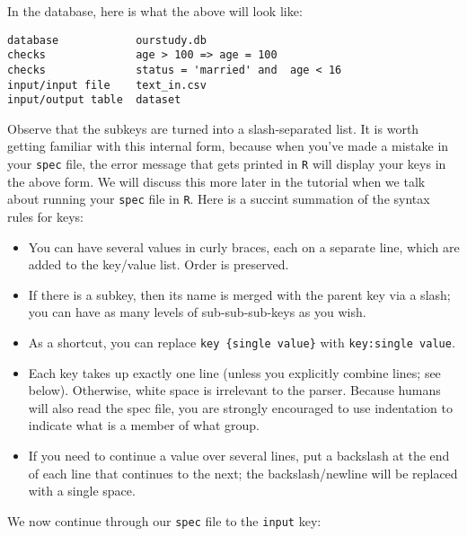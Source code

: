 \documentclass{article}
\begin{document}
In the database, here is what the above will look like:
\begin{verbatim}
database            ourstudy.db
checks              age > 100 => age = 100
checks              status = 'married' and  age < 16
input/input file    text_in.csv
input/output table  dataset
\end{verbatim}

Observe that the subkeys are turned into a slash-separated list. It is 
worth getting familiar with this internal form, because when you've made a 
mistake in your {\tt spec} file, the error message that gets printed in {\tt R} 
will display your keys in the above form. We will discuss this more later in the 
tutorial when we talk about running your {\tt spec} file in {\tt R}.
Here is a succint summation of the syntax rules for keys:

\begin{itemize}
\item You can have several values in curly braces, each on a separate line, which are added to the key/value list. Order is preserved.
\item If there is a subkey, then its name is merged with the parent key via a slash;
you can have as many levels of sub-sub-sub-keys as you wish.
\item As a shortcut, you can replace {\tt key \{single value\}} with {\tt key:single value}.
\item Each key takes up exactly one line (unless you explicitly combine lines; see below). Otherwise, white
space is irrelevant to the parser. Because humans will also read the spec file, you
are strongly encouraged to use indentation to indicate what is a member of what group.
\item If you need to continue a value over several lines, put a backslash at the end of
each line that continues to the next; the backslash/newline will be replaced with a single space.
\end{itemize}

We now continue through our {\tt spec} file to the {\tt input} key:
\end{document}
